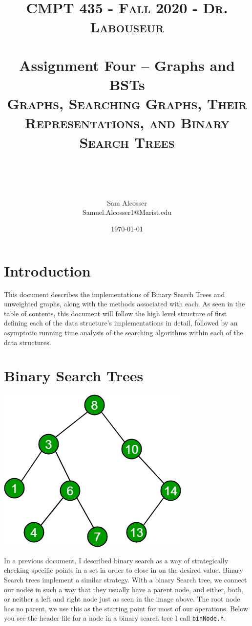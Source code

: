 \documentclass[letterpaper, 10pt]{article}
\title{	
   \normalfont \normalsize 
   \textsc{CMPT 435 - Fall 2020 - Dr. Labouseur} \\[10pt] %
   \horrule{0.5pt} \\[0.25cm] 	%
   \large{Assignment Four -- Graphs and BSTs} \\
   \textsc{Graphs, Searching Graphs, Their Representations, and Binary Search Trees}\\[20pt]%
 \author{Sam Alcosser \\ \normalsize Samuel.Alcosser1@Marist.edu}
   \horrule{0.5pt} \\ 	%
   


  
\date{\normalsize\today} 
}
\begin{document}
\selectfont
\maketitle
\tableofcontents
\newpage

\section{Introduction}

This document describes the implementations of Binary Search Trees and unweighted graphs, along with the methods associated with each. As seen in the table of contents, this document will follow the high level structure of first defining each of the data structure's implementations in detail, followed by an asymptotic running time analysis of the searching algorithms within each of the data structures.


\section{Binary Search Trees}
\begin{center}
    \includegraphics[width=\textwidth  / 2]{BST.png}

\end{center}

In a previous document, I described binary search as a way of strategically checking specific points in a set in order to close in on the desired value. Binary Search trees implement a similar strategy. With a binary Search tree, we connect our nodes in such a way that they usually have a parent node, and either, both, or neither a left and right node just as seen in the image above. The root node has no parent, we use this as the starting point for most of our operations. Below you see the header file for a node in a binary search tree I call \texttt{binNode.h}.
\end{document}
